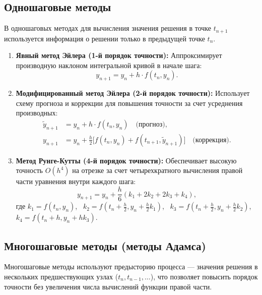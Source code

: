 \documentclass[a4paper]{article}
\begin{document}
\subsection{Одношаговые методы}
В одношаговых методах для вычисления значения решения в точке $t_{n+1}$ используется информация о решении только в предыдущей точке $t_n$.

\begin{enumerate}
    \item \textbf{Явный метод Эйлера (1-й порядок точности):}
    Аппроксимирует производную наклоном интегральной кривой в начале шага:
    \begin{equation}
    y_{n+1} = y_n + h \cdot f(t_n, y_n).
    \end{equation}
    
    \item \textbf{Модифицированный метод Эйлера (2-й порядок точности):}
    Использует схему прогноза и коррекции для повышения точности за счет усреднения производных:
    \begin{align}
    \tilde{y}_{n+1} &= y_n + h \cdot f(t_n, y_n) \quad \text{(прогноз)}, \\
    y_{n+1} &= y_n + \frac{h}{2} \Big[ f(t_n, y_n) + f(t_{n+1}, \tilde{y}_{n+1}) \Big] \quad \text{(коррекция)}.
    \end{align}
    
    \item \textbf{Метод Рунге-Кутты (4-й порядок точности):}
    Обеспечивает высокую точность $O(h^4)$ на отрезке за счет четырехкратного вычисления правой части уравнения внутри каждого шага:
    \begin{equation}
    y_{n+1} = y_n + \frac{h}{6}(k_1 + 2k_2 + 2k_3 + k_4),
    \end{equation}
    где $k_1 = f(t_n, y_n)$, \ $k_2 = f\left(t_n + \frac{h}{2}, y_n + \frac{h}{2}k_1\right)$, \ $k_3 = f\left(t_n + \frac{h}{2}, y_n + \frac{h}{2}k_2\right)$, \ $k_4 = f(t_n + h, y_n + hk_3)$.
\end{enumerate}

\subsection{Многошаговые методы (методы Адамса)}
Многошаговые методы используют предысторию процесса — значения решения в нескольких предшествующих узлах ($t_n, t_{n-1}, \dots$), что позволяет повысить порядок точности без увеличения числа вычислений функции правой части.
\end{document}
